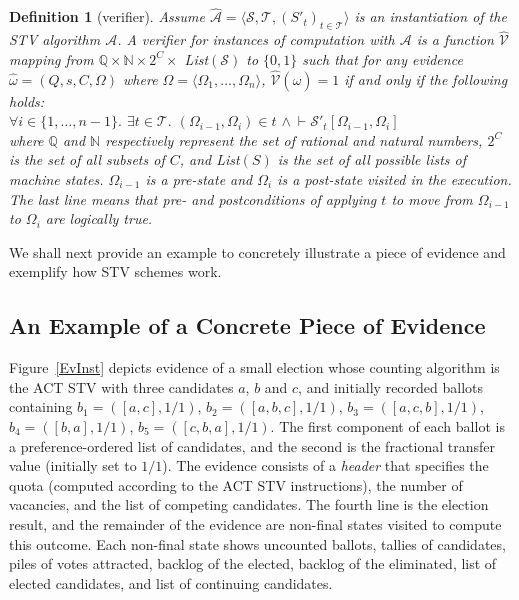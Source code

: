 \documentclass[10pt,conference]{IEEEtran}
\newtheorem{definition}{Definition}
\begin{document}
\begin{definition}[verifier]\label{verifier}
Assume $\hat{\mathcal{A}}= \langle \mathcal{S}, \mathcal{T}, (S'_t)_{t \in \mathcal{T}} \rangle$ is an instantiation of the STV algorithm $\mathcal{A}$. A verifier for instances of computation with $\mathcal{A}$ is a function $\hat{\mathcal{V}}$ mapping from $\mathbb{Q}\times\mathbb{N}\times 2^{C}\times$ \textsf{List}$(\mathcal{S})$ to $\{0,1\}$ such that for any evidence $\hat{\omega} = (Q,s,C,\Omega)$ where $\Omega=\langle\Omega_{1},\dots,\Omega_{n}\rangle$, $\hat{\mathcal{V}}(\hat{\omega}) = 1$ if and only if the following holds:\\
$\forall i\in\{1,\dots,n-1\}.$ 
$\exists t\in\mathcal{T}.$  $(\Omega_{i-1},\Omega_{i})\in t$ $\wedge~\vdash\mathcal{S}'_{t}[\Omega_{i-1},\Omega_{i}]$\\ 
where $\mathbb{Q}$ and $\mathbb{N}$ respectively represent the set of rational and natural numbers, $2^{C}$ is the set of all subsets of $C$, and \textsf{List}$(S)$ is the set of all possible lists of machine states. $\Omega_{i-1}$ is a pre-state and $\Omega_{i}$ is a post-state visited in the execution. The last line means that pre- and postconditions  of applying $t$ to move from $\Omega_{i-1}$ to $\Omega_{i}$  are logically true. 
\end{definition} 
We shall next provide an example to concretely illustrate a piece of evidence and exemplify how STV schemes work. 
 \subsection{An Example of a Concrete Piece of Evidence}
\label{subsec:InstEv}
Figure~\ref{EvInst} depicts evidence of a small election whose counting algorithm is the ACT STV 
with three candidates $a$, $b$ and $c$, and initially recorded ballots containing
$b_1=([a,c],1/1)$, $b_2=([a,b,c],1/1)$, $b_3=([a,c,b],1/1)$,
$b_4=([b,a],1/1)$, $b_5=([c,b,a],1/1)$.  The first component of each ballot is a preference-ordered list of candidates, and the second is the fractional transfer value (initially set to $1/1$). The evidence consists of a \emph{header} that specifies the quota (computed according to the ACT STV instructions), the number of vacancies, and the list of competing candidates. 
The fourth line is the election result, and the remainder of the evidence are non-final states visited to compute this
outcome. Each non-final state shows uncounted ballots, tallies of candidates, piles of votes attracted, backlog of the elected, backlog of the eliminated, list of elected candidates, and list of continuing candidates. 
\end{document}
